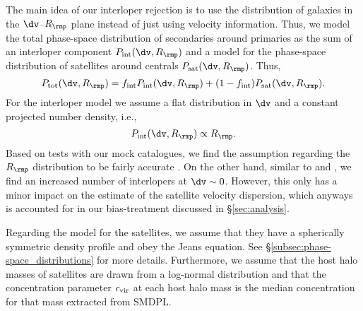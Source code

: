 \documentclass[fleqn,usenatbib,useAMS]{mnras}
\begin{document}
	The main idea of our interloper rejection is to use the distribution of galaxies in the $\dv$--$R_\rmp$ plane instead of just using velocity information. Thus, we model the total phase-space distribution of secondaries around primaries as the sum of an interloper component $P_{\rm int} (\dv, R_\rmp)$ and a model for the phase-space distribution of satellites around centrals $P_{\rm sat}(\dv, R_\rmp)$. Thus,
	\begin{equation}
	P_{\rm tot} (\dv, R_\rmp) = f_{\rm int} P_{\rm int} (\dv, R_\rmp) + (1 - f_{\rm int}) P_{\rm sat} (\dv, R_\rmp).
	\end{equation}
	For the interloper model we assume a flat distribution in $\dv$ and a constant projected number density, i.e., 
	\begin{equation}
	P_{\rm int} (\dv, R_\rmp) \propto R_\rmp.
	\end{equation}
	Based on tests with our mock catalogues, we find the assumption regarding the $R_\rmp$  distribution to be fairly accurate \citep[see also][]{Wojtak+13, Zheng+16}. On the other hand, similar to \cite{vdBosch+04} and \cite{More+09b}, we find an increased number of interlopers at $\dv \sim 0$. However, this only has a minor impact on the estimate of the satellite velocity dispersion, which anyways is accounted for in our bias-treatment discussed in \S\ref{sec:analysis}.
	
	Regarding the model for the satellites, we assume that they have a spherically symmetric density profile and obey the Jeans equation. See \S\ref{subsec:phase-space_distributions} for more details. Furthermore, we assume that the host halo masses of satellites are drawn from a log-normal distribution and that the concentration parameter $c_{\rm vir}$ at each host halo mass is the median concentration for that mass extracted from SMDPL.
	
\end{document}

